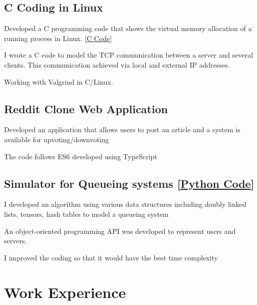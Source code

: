 \documentclass[letter,11pt]{article}
\begin{document}
\subsection{C Coding in Linux}
\begin{zitemize}
	\item Developed a C programming code that shows the virtual memory allocation of a running process in Linux. [\href{https://github.com/Hadi2525/vmemory_maps}{C Code}]
	\item I wrote a C code to model the TCP communication between a server and several clients. This communication achieved via local and external IP addresses.
	\item Working with Valgrind in C/Linux.
\end{zitemize}
\subsection{Reddit Clone Web Application}
\begin{zitemize}
	\item Developed an application that allows users to post an article and a system is available for upvoting/downvoting
	\item The code follows ES6 developed using TypeScript
\end{zitemize}
\subsection{Simulator for Queueing systems [\href{https://github.com/Hadi2525/queueing_theory}{Python Code}]}
\begin{zitemize}
	\item I developed an algorithm using various data structures including doubly linked lists, tensors, hash tables to model a queueing system
	\item An object-oriented programming API was developed to represent users and servers.
	\item I improved the coding so that it would have the best time complexity 
\end{zitemize}


\section{Work Experience}
\end{document}
